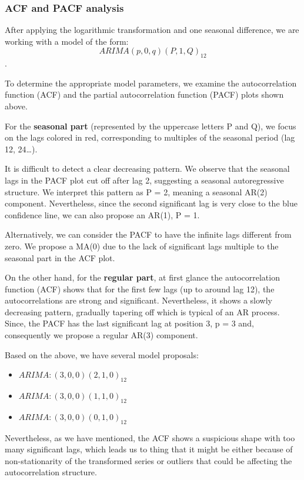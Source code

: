 \documentclass[
]{article}
\providecommand{\tightlist}{%
  \setlength{\itemsep}{0pt}\setlength{\parskip}{0pt}}
\begin{document}
\hypertarget{acf-and-pacf-analysis}{%
\subsubsection{ACF and PACF analysis}\label{acf-and-pacf-analysis}}

After applying the logarithmic transformation and one seasonal
difference, we are working with a model of the form:
\[ARIMA(p, 0, q)(P, 1, Q)_{12}\].

To determine the appropriate model parameters, we examine the
autocorrelation function (ACF) and the partial autocorrelation function
(PACF) plots shown above.

For the \textbf{seasonal part} (represented by the uppercase letters P
and Q), we focus on the lags colored in red, corresponding to multiples
of the seasonal period (lag 12, 24\ldots).

It is difficult to detect a clear decreasing pattern. We observe that
the seasonal lags in the PACF plot cut off after lag 2, suggesting a
seasonal autoregressive structure. We interpret this pattern as P = 2,
meaning a seasonal AR(2) component. Nevertheless, since the second
significant lag is very close to the blue confidence line, we can also
propose an AR(1), P = 1.

Alternatively, we can consider the PACF to have the infinite lags
different from zero. We propose a MA(0) due to the lack of significant
lags multiple to the seasonal part in the ACF plot.

On the other hand, for the \textbf{regular part}, at first glance the
autocorrelation function (ACF) shows that for the first few lags (up to
around lag 12), the autocorrelations are strong and significant.
Nevertheless, it shows a slowly decreasing pattern, gradually tapering
off which is typical of an AR process. Since, the PACF has the last
significant lag at position 3, p = 3 and, consequently we propose a
regular AR(3) component.

Based on the above, we have several model proposals:

\begin{itemize}
\tightlist
\item
  \(ARIMA: (3, 0, 0)(2, 1, 0)_{12}\)
\item
  \(ARIMA: (3, 0, 0)(1, 1, 0)_{12}\)
\item
  \(ARIMA: (3, 0, 0)(0, 1, 0)_{12}\)
\end{itemize}

Nevertheless, as we have mentioned, the ACF shows a suspicious shape
with too many significant lags, which leads us to thing that it might be
either because of non-stationarity of the transformed series or outliers
that could be affecting the autocorrelation structure.
\end{document}

